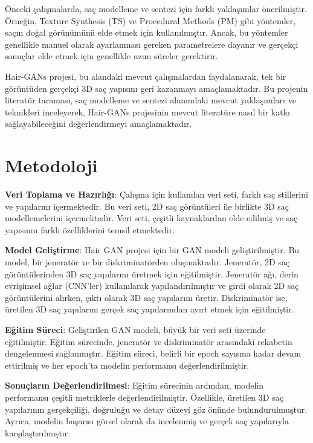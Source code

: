 \documentclass[12pt]{article}
\begin{document}
Önceki çalışmalarda, saç modelleme ve sentezi için farklı yaklaşımlar önerilmiştir. Örneğin, Texture Synthesis (TS) ve Procedural Methods (PM) gibi yöntemler, saçın doğal görünümünü elde etmek için kullanılmıştır. Ancak, bu yöntemler genellikle manuel olarak ayarlanması gereken parametrelere dayanır ve gerçekçi sonuçlar elde etmek için genellikle uzun süreler gerektirir.

Hair-GANs projesi, bu alandaki mevcut çalışmalardan faydalanarak, tek bir görüntüden gerçekçi 3D saç yapısını geri kazanmayı amaçlamaktadır. Bu projenin literatür taraması, saç modelleme ve sentezi alanındaki mevcut yaklaşımları ve teknikleri inceleyerek, Hair-GANs projesinin mevcut literatüre nasıl bir katkı sağlayabileceğini değerlendirmeyi amaçlamaktadır.\cite{ma2021generative}
\section{Metodoloji}
{\textbf{Veri Toplama ve Hazırlığı}}: Çalışma için kullanılan veri seti, farklı saç stillerini ve yapılarını içermektedir. Bu veri seti, 2D saç görüntüleri ile birlikte 3D saç modellemelerini içermektedir. Veri seti, çeşitli kaynaklardan elde edilmiş ve saç yapısının farklı özelliklerini temsil etmektedir.

{\textbf{Model Geliştirme}}: Hair GAN projesi için bir GAN modeli geliştirilmiştir. Bu model, bir jeneratör ve bir diskriminatörden oluşmaktadır. Jeneratör, 2D saç görüntülerinden 3D saç yapılarını üretmek için eğitilmiştir. Jeneratör ağı, derin evrişimsel ağlar (CNN'ler) kullanılarak yapılandırılmıştır ve girdi olarak 2D saç görüntülerini alırken, çıktı olarak 3D saç yapılarını üretir. Diskriminatör ise, üretilen 3D saç yapılarını gerçek saç yapılarından ayırt etmek için eğitilmiştir.

{\textbf{Eğitim Süreci}}: Geliştirilen GAN modeli, büyük bir veri seti üzerinde eğitilmiştir. Eğitim sürecinde, jeneratör ve diskriminatör arasındaki rekabetin dengelenmesi sağlanmıştır. Eğitim süreci, belirli bir epoch sayısına kadar devam ettirilmiş ve her epoch'ta modelin performansı değerlendirilmiştir.

{\textbf{Sonuçların Değerlendirilmesi}}: Eğitim sürecinin ardından, modelin performansı çeşitli metriklerle değerlendirilmiştir. Özellikle, üretilen 3D saç yapılarının gerçekçiliği, doğruluğu ve detay düzeyi göz önünde bulundurulmuştur. Ayrıca, modelin başarısı görsel olarak da incelenmiş ve gerçek saç yapılarıyla karşılaştırılmıştır.
\end{document}
